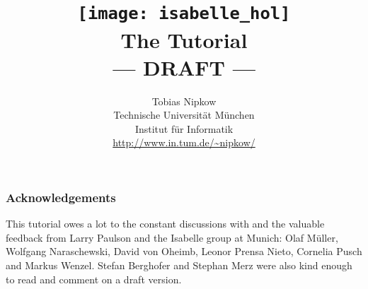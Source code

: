 \documentclass[11pt,a4paper]{report}
\begin{document}
\title{\texttt{[image: isabelle\_hol]}
       \\ \vspace{0.5cm} The Tutorial
       \\ --- DRAFT ---}
\author{Tobias Nipkow\\
Technische Universit\"at M\"unchen \\
Institut f\"ur Informatik \\
\url{http://www.in.tum.de/~nipkow/}}
\maketitle

\tableofcontents

\subsubsection*{Acknowledgements}
This tutorial owes a lot to the constant discussions with and the valuable
feedback from Larry Paulson and the Isabelle group at Munich: Olaf M\"uller,
Wolfgang Naraschewski, David von Oheimb, Leonor Prensa Nieto, Cornelia Pusch
and Markus Wenzel. Stefan Berghofer and Stephan Merz were also kind enough to
read and comment on a draft version.
\clearfirst







\printindex
\end{document}
